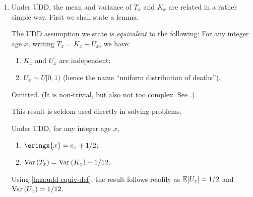 \begin{enumerate}
\item Under UDD, the mean and variance of \(T_x\) and \(K_x\) are related in a rather simple way.
First we shall state a lemma:
\begin{lemma}
\label{lma:udd-equiv-def}
The UDD assumption we state is \emph{equivalent} to
the following: For any integer age \(x\), writing
\(T_x=K_x+U_x\), we have:
\begin{enumerate}
\item \(K_x\) and \(U_x\) are independent;
\item \(U_x\sim U[0,1)\) (hence the name ``uniform distribution of deaths'').
\end{enumerate}
\end{lemma}

\begin{pf}
Omitted. (It is non-trivial, but also not too complex. See \textcite[Section~3.3.1]{dickson2019actuarial}.)
\end{pf}

\begin{note}
This result is seldom used directly in solving problems.
\end{note}

\begin{proposition}
\label{prp:udd-mean-variance}
Under UDD, for any integer age \(x\),
\begin{enumerate}
\item \(\eringx{x}=e_x+1/2\);
\item \(\operatorname{Var}\qty(T_x)=\operatorname{Var}\qty(K_x)+1/12\).
\end{enumerate}
\end{proposition}

\begin{pf}
Using \cref{lma:udd-equiv-def}, the result follows readily as
\(\mathbb{E}\qty[U_x]=1/2\) and \(\operatorname{Var}\qty(U_x)=1/12\).
\end{pf}


\end{enumerate}
